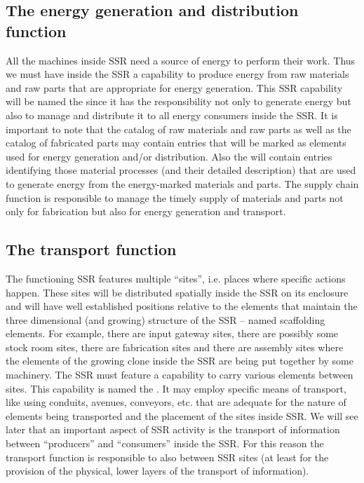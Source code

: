 \subsection[The energy generation and distribution function]{The energy
generation and distribution function}

All the machines inside SSR need
a source of energy to perform their work. Thus we must have inside the
SSR a capability to produce energy from raw materials and raw parts
that are appropriate for energy generation. This SSR capability will be
named the  since it
has the responsibility not only to generate energy but also to manage
and distribute it to all energy consumers inside the SSR. It is
important to note that the catalog of raw materials and raw parts as
well as the catalog of fabricated parts may contain entries that will
be marked as elements used for energy generation and/or distribution.
Also the  will contain entries identifying
those material processes (and their detailed description) that are used
to generate energy from the energy-marked materials and parts. The
supply chain function is responsible to manage the timely supply of
materials and parts not only for fabrication but also for energy
generation and transport.

\subsection[The transport function]{The transport function}

The functioning SSR features
multiple “sites”, i.e. places where specific actions happen. These
sites will be distributed spatially inside the SSR on its enclosure
and will have well established positions relative to the elements that
maintain the three dimensional (and growing) structure of the SSR –
named scaffolding elements. For example, there are input gateway sites,
there are possibly some stock room sites, there are fabrication sites
and there are assembly sites where the elements of the growing clone
inside the SSR are being put together by some machinery. The SSR must
feature a capability to carry various elements between sites. This
capability is named the . It may employ
specific means of transport, like using conduits, avenues, conveyors,
etc. that are adequate for the nature of elements being transported and
the placement of the sites inside SSR.  We will see later that an
important aspect of SSR activity is the transport of information
between “producers” and “consumers” inside the SSR. For this reason the
transport function is responsible to also  
between SSR sites (at least for the provision of the
physical, lower layers of the transport of information).

